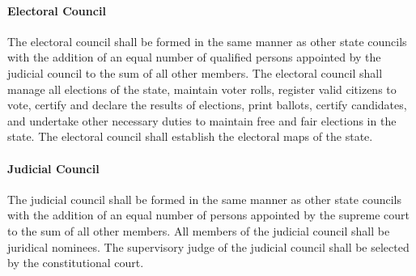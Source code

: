 \documentclass{article}
\begin{document}
\paragraph{Electoral Council}
The electoral council shall be formed in the same manner as other state councils with the addition of an equal number of qualified persons appointed by the judicial council to the sum of all other members. The electoral council shall manage all elections of the state, maintain voter rolls, register valid citizens to vote, certify and declare the results of elections, print ballots, certify candidates, and undertake other necessary duties to maintain free and fair elections in the state. The electoral council shall establish the electoral maps of the state.
\paragraph{Judicial Council}
The judicial council shall be formed in the same manner as other state councils with the addition of an equal number of persons appointed by the supreme court to the sum of all other members. All members of the judicial council shall be juridical nominees. The supervisory judge of the judicial council shall be selected by the constitutional court.
\newpage
\end{document}
